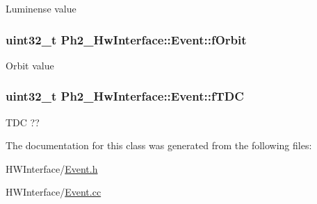 Luminense value \hypertarget{class_ph2___hw_interface_1_1_event_a6aa6c402d2b16e735fbb4b7518c2666e}{
\subsubsection[{f\-Orbit}]{\setlength{\rightskip}{0pt plus 5cm}uint32\-\_\-t Ph2\-\_\-\-Hw\-Interface\-::\-Event\-::f\-Orbit\hspace{0.3cm}{\ttfamily [private]}}}\label{class_ph2___hw_interface_1_1_event_a6aa6c402d2b16e735fbb4b7518c2666e}
Orbit value \hypertarget{class_ph2___hw_interface_1_1_event_ab91638311238d12f1cd258556c8d1d80}{
\subsubsection[{f\-T\-D\-C}]{\setlength{\rightskip}{0pt plus 5cm}uint32\-\_\-t Ph2\-\_\-\-Hw\-Interface\-::\-Event\-::f\-T\-D\-C\hspace{0.3cm}{\ttfamily [private]}}}\label{class_ph2___hw_interface_1_1_event_ab91638311238d12f1cd258556c8d1d80}
T\-D\-C ?? 

The documentation for this class was generated from the following files\-:\begin{DoxyCompactItemize}
\item 
H\-W\-Interface/\hyperlink{_event_8h}{Event.\-h}\item 
H\-W\-Interface/\hyperlink{_event_8cc}{Event.\-cc}\end{DoxyCompactItemize}
